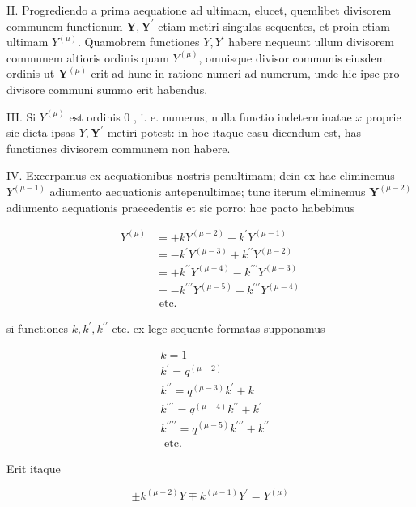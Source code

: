 \documentclass[10pt]{article}
\begin{document}
II. Progrediendo a prima aequatione ad ultimam, elucet, quemlibet divisorem communem functionum \(\boldsymbol{Y}, \boldsymbol{Y}^{\prime}\) etiam metiri singulas sequentes, et proin etiam ultimam \(Y^{(\mu)}\). Quamobrem functiones \(Y, Y^{\prime}\) habere nequeunt ullum divisorem communem altioris ordinis quam \(Y^{(\mu)}\), omnisque divisor communis eiusdem ordinis ut \(\boldsymbol{Y}^{(\mu)}\) erit ad hunc in ratione numeri ad numerum, unde hic ipse pro divisore communi summo erit habendus.

III. Si \(Y^{(\mu)}\) est ordinis 0 , i. e. numerus, nulla functio indeterminatae \(x\) proprie sic dicta ipsas \(Y, \boldsymbol{Y}^{\prime}\) metiri potest: in hoc itaque casu dicendum est, has functiones divisorem communem non habere.

IV. Excerpamus ex aequationibus nostris penultimam; dein ex hac eliminemus \(Y^{(\mu-1)}\) adiumento aequationis antepenultimae; tunc iterum eliminemus \(\boldsymbol{Y}^{(\mu-2)}\) adiumento aequationis praecedentis et sic porro: hoc pacto habebimus

\[
\begin{aligned}
Y^{(\mu)} & =+k Y^{(\mu-2)}-k^{\prime} Y^{(\mu-1)} \\
& =-k^{\prime} Y^{(\mu-3)}+k^{\prime \prime} Y^{(\mu-2)} \\
& =+k^{\prime \prime} Y^{(\mu-4)}-k^{\prime \prime \prime} Y^{(\mu-3)} \\
& =-k^{\prime \prime \prime} Y^{(\mu-5)}+k^{\prime \prime \prime} Y^{(\mu-4)} \\
& \text { etc. }
\end{aligned}
\]

si functiones \(k, k^{\prime}, k^{\prime \prime}\) etc. ex lege sequente formatas supponamus

\[
\begin{aligned}
& k=1 \\
& k^{\prime}=q^{(\mu-2)} \\
& k^{\prime \prime}=q^{(\mu-3)} k^{\prime}+k \\
& k^{\prime \prime \prime}=q^{(\mu-4)} k^{\prime \prime}+k^{\prime} \\
& k^{\prime \prime \prime \prime}=q^{(\mu-5)} k^{\prime \prime \prime}+k^{\prime \prime} \\
& \text { etc. }
\end{aligned}
\]

Erit itaque

\[
\pm k^{(\mu-2)} Y \mp k^{(\mu-1)} Y^{\prime}=Y^{(\mu)}
\]
\end{document}
